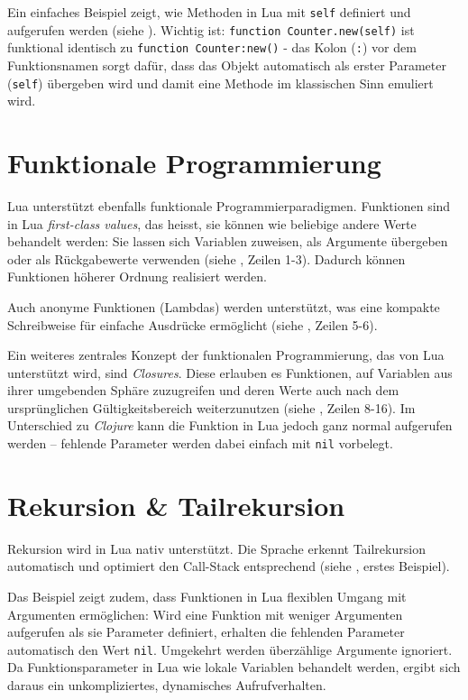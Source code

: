 \documentclass[11pt,a4paper]{article}
\begin{document}
Ein einfaches Beispiel zeigt, wie Methoden in Lua mit \texttt{self} definiert und aufgerufen werden (siehe ).
Wichtig ist: \colorbox{codegray}{\lstinline|function Counter.new(self)|} ist funktional identisch zu \colorbox{codegray}{\lstinline|function Counter:new()|} -
das Kolon (\texttt{:}) vor dem Funktionsnamen sorgt dafür, dass das Objekt automatisch als erster Parameter (\texttt{self}) 
übergeben wird und damit eine Methode im klassischen Sinn emuliert wird.

\section*{Funktionale Programmierung}

Lua unterstützt ebenfalls funktionale Programmierparadigmen. Funktionen sind in Lua \textit{first-class values}, das heisst, 
sie können wie beliebige andere Werte behandelt werden: Sie lassen sich Variablen zuweisen, als Argumente übergeben 
oder als Rückgabewerte verwenden (siehe , Zeilen 1-3). Dadurch können Funktionen höherer Ordnung realisiert werden.

Auch anonyme Funktionen (Lambdas) werden unterstützt, was eine kompakte Schreibweise für einfache Ausdrücke ermöglicht (siehe , Zeilen 5-6).

Ein weiteres zentrales Konzept der funktionalen Programmierung, das von Lua unterstützt wird, sind \textit{Closures}. 
Diese erlauben es Funktionen, auf Variablen aus ihrer umgebenden Sphäre zuzugreifen und deren Werte auch nach dem ursprünglichen Gültigkeitsbereich weiterzunutzen (siehe , Zeilen 8-16).
Im Unterschied zu \textit{Clojure} kann die Funktion in Lua jedoch ganz normal aufgerufen werden – fehlende Parameter werden dabei einfach mit \texttt{nil} vorbelegt.

\section*{Rekursion \& Tailrekursion}

Rekursion wird in Lua nativ unterstützt. Die Sprache erkennt Tailrekursion automatisch und optimiert den Call-Stack entsprechend (siehe , erstes Beispiel).

Das Beispiel zeigt zudem, dass Funktionen in Lua flexiblen Umgang mit Argumenten ermöglichen: 
Wird eine Funktion mit weniger Argumenten aufgerufen als sie Parameter definiert, erhalten die fehlenden Parameter automatisch den Wert \texttt{nil}. 
Umgekehrt werden überzählige Argumente ignoriert. 
Da Funktionsparameter in Lua wie lokale Variablen behandelt werden, ergibt sich daraus ein unkompliziertes, dynamisches Aufrufverhalten.
\end{document}
